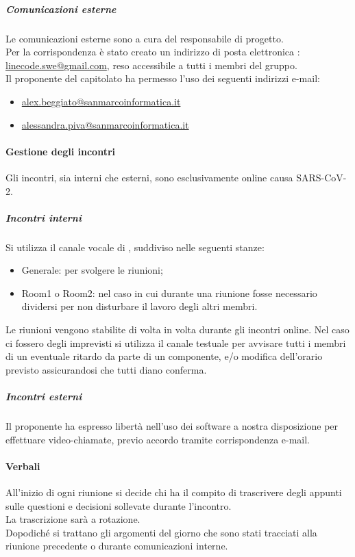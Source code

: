     		\subparagraph{Comunicazioni esterne}
    		Le comunicazioni esterne sono a cura del responsabile di progetto. \\
    		Per la corrispondenza è stato creato un indirizzo di posta elettronica : \url{linecode.swe@gmail.com}, reso accessibile a tutti i membri del gruppo.\\
    		Il proponente del capitolato ha  permesso l'uso dei seguenti indirizzi e-mail:
    		\begin{itemize}
    		    \item \url{alex.beggiato@sanmarcoinformatica.it}
    		 	\item \url{alessandra.piva@sanmarcoinformatica.it}
    		\end{itemize}

        \paragraph{Gestione degli incontri}
        Gli incontri, sia interni che esterni, sono esclusivamente online causa SARS-CoV-2.

            \subparagraph{Incontri interni}
            Si utilizza il canale vocale di , suddiviso nelle seguenti stanze:
            \begin{itemize}
                \item {\sffamily Generale}: per svolgere le riunioni;
                \item {\sffamily Room1} o {\sffamily Room2}: nel caso in cui durante una riunione fosse necessario dividersi per non disturbare il lavoro degli altri membri.
            \end{itemize}
            Le riunioni vengono stabilite di volta in volta durante gli incontri online.
            Nel caso ci fossero degli imprevisti si utilizza il canale testuale per avvisare tutti i membri di un eventuale ritardo da parte di un componente, e/o modifica dell'orario previsto assicurandosi che tutti diano conferma.

            \subparagraph{Incontri esterni}
            Il proponente ha espresso libertà nell'uso dei software a nostra disposizione per effettuare video-chiamate, previo accordo tramite corrispondenza e-mail.

		\paragraph{Verbali}
        All'inizio di ogni riunione si decide chi ha il compito di trascrivere degli appunti sulle questioni e decisioni sollevate durante l'incontro. \\
        La trascrizione sarà a rotazione.\\
        Dopodiché si trattano gli argomenti del giorno che sono stati tracciati alla riunione precedente o durante comunicazioni interne.

